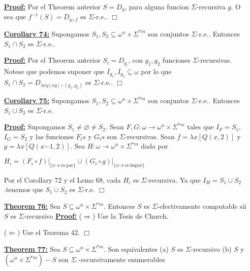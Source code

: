 \textbf{\underline{Proof:}} Por el Theorem anterior \(S=D_{g}\), para alguna funcion \(\Sigma \)-recursiva \( g \). O sea que \(f^{-1}(S)=D_{g\circ f}\) es \(\Sigma \)-r.e.. \(\Box\)


\textbf{\underline{Corollary 74:}} Supongamos \(S_{1},S_{2}\subseteq \omega ^{n}\times \Sigma ^{\ast m}\) son conjuntos \(\Sigma \)-r.e.. Entonces \(S_{1}\cap S_{2}\) es \(\Sigma \)-r.e..

\textbf{\underline{Proof:}} Por el Theorem anterior \(S_{i}=D_{g_{i}}\), con \(g_{1},g_{2}\) funciones \( \Sigma \)-recursivas\(.\) Notese que podemos suponer que \(I_{g_{1}},I_{g_{2}} \subseteq \omega \) por lo que \(S_{1}\cap S_{2}=D_{\lambda xy\left[ xy\right] \circ (g_{1},g_{2})}\) es \(\Sigma \)-r.e.\(.\) \(\Box\)


\textbf{\underline{Corollary 75:}} Supongamos \(S_{1},S_{2}\subseteq \omega ^{n}\times \Sigma ^{\ast m}\) son conjuntos \(\Sigma \)-r.e.. Entonces \(S_{1}\cup S_{2}\) es \(\Sigma \)-r.e.

\textbf{\underline{Proof:}} Supongamos \(S_{1}\neq \varnothing \neq S_{2}.\) Sean \(F,G:\omega \rightarrow \omega ^{n}\times \Sigma ^{\ast m}\) tales que \(I_{F}=S_{1}\), \(I_{G}=S_{2}\) y las funciones \(F_{i} {\acute{}} s\) y \(G_{i} {\acute{}} s\) son \(\Sigma \)-recursivas. Sean \(f=\lambda x\left[ Q(x,2)\right] \) y \( g=\lambda x\left[ Q(x\dot{-}1,2)\right] .\) Sea \(H:\omega \rightarrow \omega ^{n}\times \Sigma ^{\ast m}\) dada por

\(\displaystyle H_{i}=(F_{i}\circ f)\mathrm{\mid }_{\{x:x\mathrm{\ es\ par}\}}\cup (G_{i}\circ g)\mathrm{\mid }_{\{x:x\mathrm{\ es\ impar}\}} \)

Por el Corollary 72 y el Lema 68, cada \(H_{i}\) es \( \Sigma \)-recursiva. Ya que \(I_{H}=S_{1}\cup S_{2}\).tenemos que \(S_{1}\cup S_{2}\) es \(\Sigma \)-r.e. \(\Box\)


\textbf{\underline{Theorem 76:}} Sea \(S\subseteq \omega ^{n}\times \Sigma ^{\ast m}\). Entonces \(S\) es \(\Sigma \)-efectivamente computable sii \(S\) es \(\Sigma \)-recursivo
\textbf{\underline{Proof:}} (\(\Rightarrow \)) Use la Tesis de Church.

(\(\Leftarrow \)) Use el Teorema 42. \(\Box\)




\textbf{\underline{Theorem 77:}} Sea \(S\subseteq \omega ^{n}\times \Sigma ^{\ast m}.\) Son equivalentes
(a) \(S\) es \(\Sigma \)-recursivo
(b) \(S\) y \((\omega ^{n}\times \Sigma ^{\ast m})-S\) son \(\Sigma \) -recursivamente enumerables


